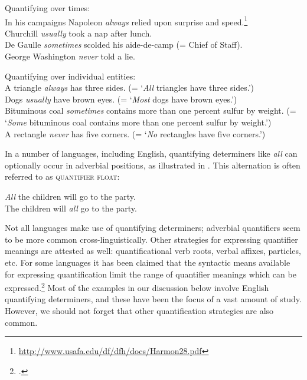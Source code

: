 \ea \label{ex:14.7}
Quantifying over times:\\
\ea In his campaigns Napoleon \textit{always} relied upon surprise and speed.\footnote{\url{http://www.usafa.edu/df/dfh/docs/Harmon28.pdf}} \\
\ex Churchill \textit{usually} took a nap after lunch.\\
\ex De Gaulle \textit{sometimes} scolded his aide-de-camp (= Chief of Staff).\\
\ex George Washington \textit{never} told a lie.
                       \z
\z

\ea \label{ex:14.8}
Quantifying over individual entities:\\
\ea A triangle \textit{always} has three sides. (= ‘\textit{All} triangles have three sides.’)\\
\ex Dogs \textit{usually} have brown eyes. (= ‘\textit{Most} dogs have brown eyes.’)\\
\ex Bituminous coal \textit{sometimes} contains more than one percent sulfur by weight. (= ‘\textit{Some} bituminous coal contains more than one percent sulfur by weight.’)\\
\ex A rectangle \textit{never} has five corners. (= ‘\textit{No} rectangles have five corners.’)
                       \z
\z


In a number of languages, including English, quantifying determiners like \textit{all} can optionally occur in adverbial positions, as illustrated in . This alternation is often referred to as \textsc{quantifier float}:

\newpage 

\ea \label{ex:14.9}
\ea \textit{All} the children will go to the party.\\
\ex The children will \textit{all} go to the party.
                       \z
\z


Not all languages make use of quantifying determiners; adverbial quantifiers seem to be more common cross-linguistically. Other strategies for expressing quantifier meanings are attested as well: quantificational verb roots, verbal affixes, particles, etc. For some languages it has been claimed that the syntactic means available for expressing quantification limit the range of quantifier meanings which can be expressed.\footnote{\citet{Baker1995,Bittner1995,KoenigMichelson2010}.} Most of the examples in our discussion below involve English quantifying determiners, and these have been the focus of a vast amount of study. However, we should not forget that other quantification strategies are also common.


